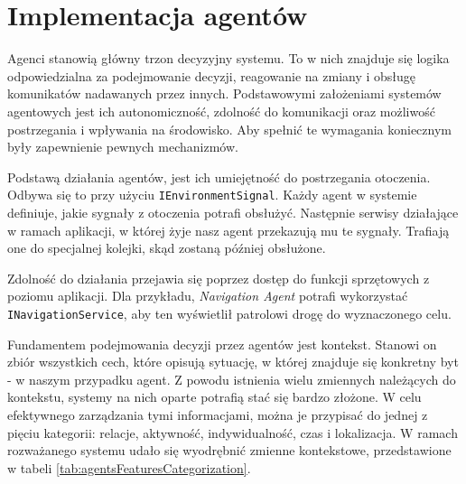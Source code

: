 \section{Implementacja agentów}
\label{sec:implementacjaAgentow} 

\par Agenci stanowią główny trzon decyzyjny systemu. To w nich znajduje się logika odpowiedzialna za podejmowanie decyzji, reagowanie na zmiany i obsługę komunikatów nadawanych przez innych. Podstawowymi założeniami systemów agentowych jest ich autonomiczność, zdolność do komunikacji oraz możliwość postrzegania i wpływania na środowisko. Aby spełnić te wymagania koniecznym były zapewnienie pewnych mechanizmów.

\par Podstawą działania agentów, jest ich umiejętność do postrzegania otoczenia. Odbywa się to przy użyciu \texttt{IEnvironmentSignal}. Każdy agent w systemie definiuje, jakie sygnały z otoczenia potrafi obsłużyć. Następnie serwisy działające w ramach aplikacji, w której żyje nasz agent przekazują mu te sygnały. Trafiają one do specjalnej kolejki, skąd zostaną później obsłużone.

\par Zdolność do działania przejawia się poprzez dostęp do funkcji sprzętowych z poziomu aplikacji. Dla przykładu, \emph{Navigation Agent} potrafi wykorzystać \texttt{INavigationService}, aby ten wyświetlił patrolowi drogę do wyznaczonego celu.


\par Fundamentem podejmowania decyzji przez agentów jest kontekst. Stanowi on zbiór wszystkich cech, które opisują sytuację, w której znajduje się konkretny byt\cite{UNDERSTANDING_AND_USING_CONTEXT} - w naszym przypadku agent. Z powodu istnienia wielu zmiennych należących do kontekstu, systemy na nich oparte potrafią stać się bardzo złożone. W celu efektywnego zarządzania tymi informacjami, można je przypisać do jednej z pięciu kategorii: relacje, aktywność, indywidualność, czas i lokalizacja\cite{AN_OPERATIONAL_DEFINITION_OF_CONTEXT}. W ramach rozważanego systemu udało się wyodrębnić zmienne kontekstowe, przedstawione w tabeli \ref{tab:agentsFeaturesCategorization}.


